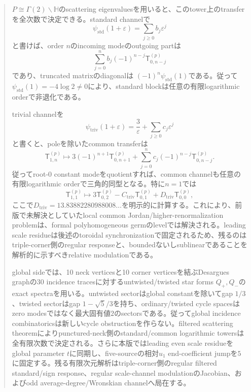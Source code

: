 \documentclass[11pt,a4paper]{ltjsarticle}
\theoremstyle{definition}
\theoremstyle{remark}
\begin{document}
\begin{abstract}
$P\cong\Gamma(2)\backslash\mathbb H$のscattering eigenvaluesを用いると、このtower上のtransferを全次数で決定できる。standard channelで
\[
 \psi_{\mathrm{std}}(1+\varepsilon)
 =\sum_{j\ge0}b_j\varepsilon^j
\]
と書けば、order $n$のincoming modeのoutgoing partは
\[
 \sum_{j=0}^n b_j(-1)^{n-j}\mathsf T_{0,n-j}^{(p)}
\]
であり、truncated matrixのdiagonalは
$(-1)^n\psi_{\mathrm{std}}(1)$である。従って
$\psi_{\mathrm{std}}(1)=-4\log2\ne0$により、standard blockは任意の有限logarithmic orderで非退化である。

trivial channelを
\[
 \psi_{\mathrm{triv}}(1+\varepsilon)
 =\frac3\varepsilon+\sum_{j\ge0}c_j\varepsilon^j
\]
と書くと、poleを除いたcommon transferは
\[
 \mathsf T_{1,n}^{(p)}\longmapsto
 3(-1)^{n+1}\mathsf T_{0,n+1}^{(p)}
 +\sum_{j=0}^{n}c_j(-1)^{n-j}
   \mathsf T_{0,n-j}^{(p)}.
\]
従ってroot-$0$ constant modeをquotientすれば、common channelも任意の有限logarithmic orderで三角的同型となる。特に$n=1$では
\[
 \mathsf T_{1,1}^{(p)}\longmapsto
 3\mathsf T_{0,2}^{(p)}
 -C_{\mathrm{triv}}\mathsf T_{0,1}^{(p)}
 +D_{\mathrm{triv}}\mathsf T_{0,0}^{(p)},
\]
ここで$D_{\mathrm{triv}}=13.83882280988008\ldots$を明示的に計算する。これにより、前版で未解決としていたlocal common Jordan/higher-renormalization problemは、formal polyhomogeneous germのlevelでは解決される。leading scale residueは後述のtoroidal synchronizationで固定されるため、残るのはtriple-corner側のregular responseと、boundedないしsublinearであることを解析的に示すべきrelative modulationである。

global sideでは、10 neck verticesと10 corner verticesを結ぶDesargues graphの30 incidence tracesに対するuntwisted/twisted star forms $Q_+,Q_-$のexact spectraを用いる。untwisted sectorはglobal constantを除いてgap $1/3$、twisted sectorはgap $1-\sqrt5/3$を持ち、ordinary/twisted cycle spacesはzero modesではなく最大固有値$2$のsectorsである。従ってglobal incidence combinatoricsは新しいcycle obstructionを作らない。filtered scattering theoremによりpunctured-neck側のstandard/common logarithmic towersは全有限次数で決定される。さらに本版ではleading even scale residueをglobal parameter $t$に同期し、five-sourceの相対$u_1$ end-coefficient jumpを$5$に固定する。残る有限次元解析はtriple-corner側のregular filtered standard/sign response、regular scale-channel modulationのJacobian、およびodd average-degree/Wronskian channelへ局在する。


\end{abstract}
\end{document}
